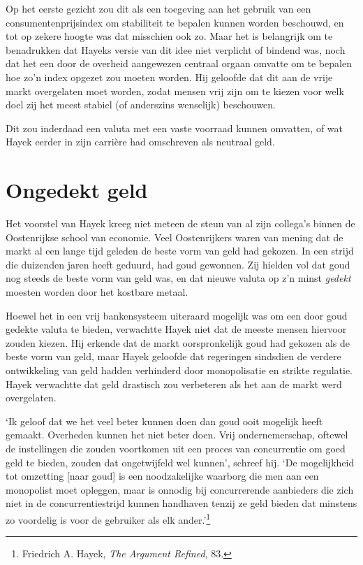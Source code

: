 \documentclass[
  a5paper,
  smalldemyvopaper,11pt,twoside,onecolumn,openright,extrafontsizes,
hidelinks]{memoir}
\begin{document}
Op het eerste gezicht zou dit als een toegeving aan het gebruik van een
consumentenprijsindex om stabiliteit te bepalen kunnen worden beschouwd,
en tot op zekere hoogte was dat misschien ook zo. Maar het is belangrijk
om te benadrukken dat Hayeks versie van dit idee niet verplicht of
bindend was, noch dat het een door de overheid aangewezen centraal
orgaan omvatte om te bepalen hoe zo'n index opgezet zou moeten worden.
Hij geloofde dat dit aan de vrije markt overgelaten moet worden, zodat
mensen vrij zijn om te kiezen voor welk doel zij het meest stabiel (of
anderszins wenselijk) beschouwen.

Dit zou inderdaad een valuta met een vaste voorraad kunnen omvatten, of
wat Hayek eerder in zijn carrière had omschreven als neutraal geld.

\section{Ongedekt geld}\label{ongedekt-geld}

Het voorstel van Hayek kreeg niet meteen de steun van al zijn collega's
binnen de Oostenrijkse school van economie. Veel Oostenrijkers waren van
mening dat de markt al een lange tijd geleden de beste vorm van geld had
gekozen. In een strijd die duizenden jaren heeft geduurd, had goud
gewonnen. Zij hielden vol dat goud nog steeds de beste vorm van geld
was, en dat nieuwe valuta op z'n minst \emph{gedekt} moesten worden door
het kostbare metaal.

Hoewel het in een vrij bankensysteem uiteraard mogelijk was om een door
goud gedekte valuta te bieden, verwachtte Hayek niet dat de meeste
mensen hiervoor zouden kiezen. Hij erkende dat de markt oorspronkelijk
goud had gekozen als de beste vorm van geld, maar Hayek geloofde dat
regeringen sindsdien de verdere ontwikkeling van geld hadden verhinderd
door monopolisatie en strikte regulatie. Hayek verwachtte dat geld
drastisch zou verbeteren als het aan de markt werd overgelaten.

`Ik geloof dat we het veel beter kunnen doen dan goud ooit mogelijk
heeft gemaakt. Overheden kunnen het niet beter doen. Vrij
ondernemerschap, oftewel de instellingen die zouden voortkomen uit een
proces van concurrentie om goed geld te bieden, zouden dat ongetwijfeld
wel kunnen', schreef hij. `De mogelijkheid tot omzetting {[}naar goud{]}
is een noodzakelijke waarborg die men aan een monopolist moet opleggen,
maar is onnodig bij concurrerende aanbieders die zich niet in de
concurrentiestrijd kunnen handhaven tenzij ze geld bieden dat minstens
zo voordelig is voor de gebruiker als elk ander.'\footnote{Friedrich A.
  Hayek, \emph{The Argument Refined}, 83.}
\end{document}
